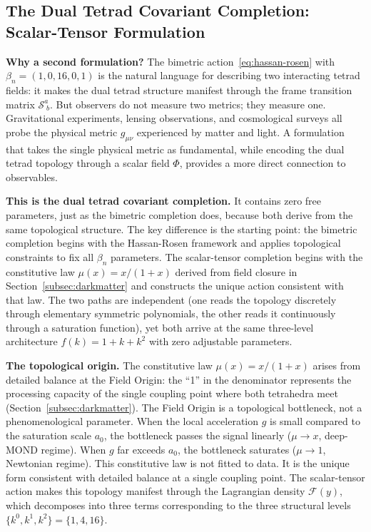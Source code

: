 \documentclass[aps,prd,preprint,superscriptaddress,showpacs,preprintnumbers,amsmath,amssymb,nofootinbib]{revtex4-2}
\begin{document}
\subsection{The Dual Tetrad Covariant Completion: Scalar-Tensor Formulation}
\label{subsec:scalar-tensor}

\textbf{Why a second formulation?} The bimetric action~\eqref{eq:hassan-rosen} with $\beta_n = (1, 0, 16, 0, 1)$ is the natural language for describing two interacting tetrad fields: it makes the dual tetrad structure manifest through the frame transition matrix $\mathcal{S}^a_{\;b}$. But observers do not measure two metrics; they measure one. Gravitational experiments, lensing observations, and cosmological surveys all probe the physical metric $g_{\mu\nu}$ experienced by matter and light. A formulation that takes the single physical metric as fundamental, while encoding the dual tetrad topology through a scalar field $\Phi$, provides a more direct connection to observables.

\textbf{This is the dual tetrad covariant completion.} It contains zero free parameters, just as the bimetric completion does, because both derive from the same topological structure. The key difference is the starting point: the bimetric completion begins with the Hassan-Rosen framework and applies topological constraints to fix all $\beta_n$ parameters. The scalar-tensor completion begins with the constitutive law $\mu(x) = x/(1+x)$ derived from field closure in Section~\ref{subsec:darkmatter} and constructs the unique action consistent with that law. The two paths are independent (one reads the topology discretely through elementary symmetric polynomials, the other reads it continuously through a saturation function), yet both arrive at the same three-level architecture $f(k) = 1 + k + k^2$ with zero adjustable parameters.

\textbf{The topological origin.} The constitutive law $\mu(x) = x/(1+x)$ arises from detailed balance at the Field Origin: the ``1'' in the denominator represents the processing capacity of the single coupling point where both tetrahedra meet (Section~\ref{subsec:darkmatter}). The Field Origin is a topological bottleneck, not a phenomenological parameter. When the local acceleration $g$ is small compared to the saturation scale $a_0$, the bottleneck passes the signal linearly ($\mu \to x$, deep-MOND regime). When $g$ far exceeds $a_0$, the bottleneck saturates ($\mu \to 1$, Newtonian regime). This constitutive law is not fitted to data. It is the unique form consistent with detailed balance at a single coupling point. The scalar-tensor action makes this topology manifest through the Lagrangian density $\mathcal{F}(y)$, which decomposes into three terms corresponding to the three structural levels $\{k^0, k^1, k^2\} = \{1, 4, 16\}$.
\end{document}
